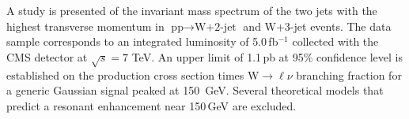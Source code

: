 A study is presented of the invariant mass spectrum of the two jets
with the highest transverse momentum in $\text{pp}\rightarrow
\text{W+2-jet}$ and W+3-jet events.  The data sample
corresponds to an integrated luminosity of 5.0\,fb$^{-1}$ collected
with the CMS detector at $\sqrt{s} = 7$ TeV.  An upper limit of
1.1\,pb at 95\% confidence level is established on the production
cross section times W$\to\ell\nu$ branching fraction for a generic
Gaussian signal peaked at 150~GeV.  Several theoretical models that
predict a resonant enhancement near 150\,GeV are excluded.
